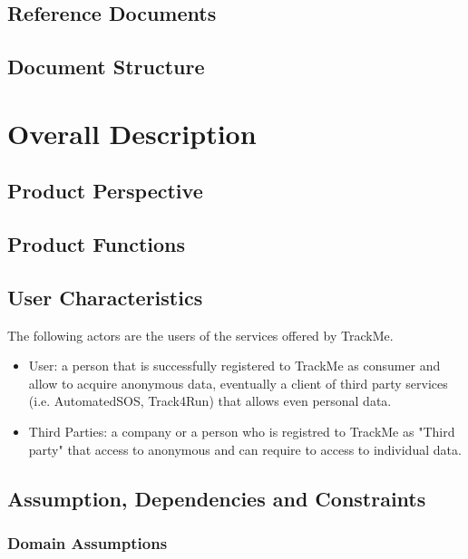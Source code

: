 \documentclass[a4paper]{article}
\begin{document}
\subsection{Reference Documents}

\subsection{Document Structure}

\section{Overall Description}

\subsection{Product Perspective}

\subsection{Product Functions}

\subsection{User Characteristics}

\begin{para}
    The following actors are the users of the services offered by TrackMe. 
\end{para}

\begin{itemize}
    \item User:  a person that is successfully registered to TrackMe as consumer and allow to acquire anonymous data, eventually a client of third party services (i.e. AutomatedSOS, Track4Run) that allows even personal data.
    
    \item Third Parties:  a company or a person who is registred to TrackMe as "Third party" that access to anonymous and can require to access to individual data.
    
\end{itemize}

\subsection{Assumption, Dependencies and Constraints}

\subsubsection{Domain Assumptions}
\end{document}
